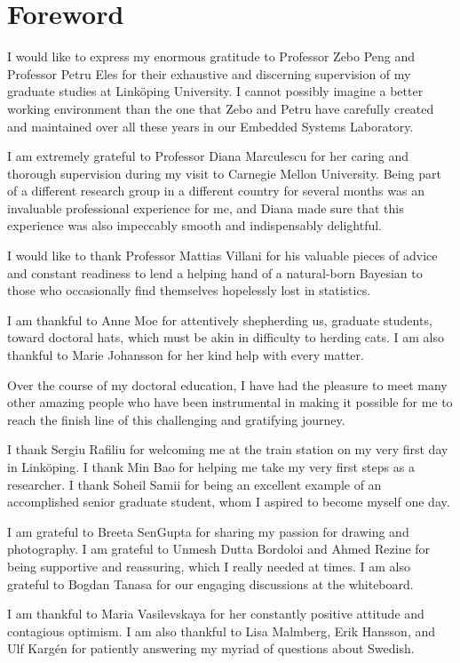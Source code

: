 \chapter*{Foreword}

I would like to express my enormous gratitude to Professor Zebo Peng and
Professor Petru Eles for their exhaustive and discerning supervision of my
graduate studies at Linköping University. I cannot possibly imagine a better
working environment than the one that Zebo and Petru have carefully created and
maintained over all these years in our Embedded Systems Laboratory.

I am extremely grateful to Professor Diana Marculescu for her caring and
thorough supervision during my visit to Carnegie Mellon University. Being part
of a different research group in a different country for several months was an
invaluable professional experience for me, and Diana made sure that this
experience was also impeccably smooth and indispensably delightful.

I would like to thank Professor Mattias Villani for his valuable pieces of
advice and constant readiness to lend a helping hand of a natural-born Bayesian
to those who occasionally find themselves hopelessly lost in statistics.

I am thankful to Anne Moe for attentively shepherding us, graduate students,
toward doctoral hats, which must be akin in difficulty to herding cats. I am
also thankful to Marie Johansson for her kind help with every matter.

Over the course of my doctoral education, I have had the pleasure to meet many
other amazing people who have been instrumental in making it possible for me to
reach the finish line of this challenging and gratifying journey.

I thank Sergiu Rafiliu for welcoming me at the train station on my very first
day in Linköping. I thank Min Bao for helping me take my very first steps as a
researcher. I thank Soheil Samii for being an excellent example of an
accomplished senior graduate student, whom I aspired to become myself one day.

I am grateful to Breeta SenGupta for sharing my passion for drawing and
photography. I am grateful to Unmesh Dutta Bordoloi and Ahmed Rezine for being
supportive and reassuring, which I really needed at times. I am also grateful to
Bogdan Tanasa for our engaging discussions at the whiteboard.

I am thankful to Maria Vasilevskaya for her constantly positive attitude and
contagious optimism. I am also thankful to Lisa Malmberg, Erik Hansson, and Ulf
Kargén for patiently answering my myriad of questions about Swedish.

